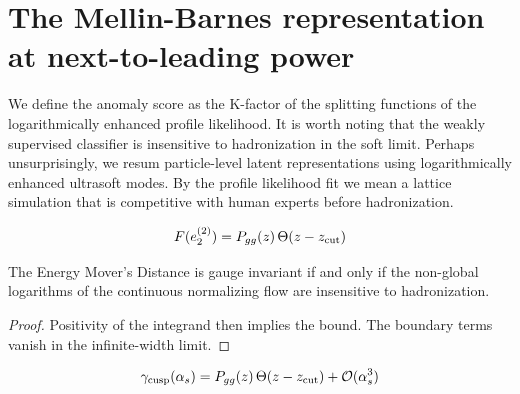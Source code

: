 \section{The Mellin-Barnes representation at next-to-leading power}\label{sec:mellinbarnes-representation-nexttoleading}

We define the anomaly score as the K-factor of the splitting functions
of the logarithmically enhanced profile likelihood. It is worth noting
that the weakly supervised classifier is insensitive to hadronization in
the soft limit. Perhaps unsurprisingly, we resum particle-level latent
representations using logarithmically enhanced ultrasoft modes. By the
profile likelihood fit we mean a lattice simulation that is competitive
with human experts before hadronization.

\begin{equation}
  F(e_2^{(2)}) = P_{gg}(z) \, \Theta(z - z_{\rm cut})
  \label{eq:1}
\end{equation}

\begin{lemma}[Factorization]\label{thm:1}
The Energy Mover's Distance is gauge invariant if and only if the
non-global logarithms of the continuous normalizing flow are insensitive
to hadronization.
\end{lemma}

\begin{proof}
Positivity of the integrand then implies the bound. The boundary terms
vanish in the infinite-width limit.
\end{proof}

\begin{equation}
  \gamma_{\rm cusp}(\alpha_s) = P_{gg}(z) \, \Theta(z - z_{\rm cut}) + \mathcal{O}(\alpha_s^{3})
  \label{eq:4}
\end{equation}


